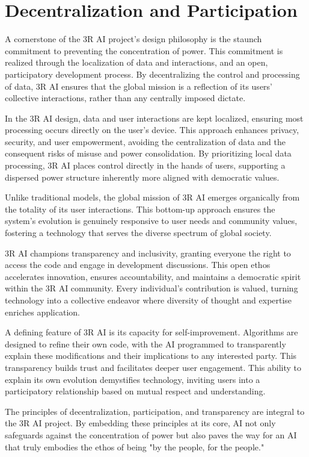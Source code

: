\documentclass[12pt]{article}
\begin{document}
\section*{Decentralization and Participation}

A cornerstone of the 3R AI project's design philosophy is the staunch commitment to preventing the concentration of power. This commitment is realized through the localization of data and interactions, and an open, participatory development process. By decentralizing the control and processing of data, 3R AI ensures that the global mission is a reflection of its users' collective interactions, rather than any centrally imposed dictate.

In the 3R AI design, data and user interactions are kept localized, ensuring most processing occurs directly on the user's device. This approach enhances privacy, security, and user empowerment, avoiding the centralization of data and the consequent risks of misuse and power consolidation. By prioritizing local data processing, 3R AI places control directly in the hands of users, supporting a dispersed power structure inherently more aligned with democratic values.

Unlike traditional models, the global mission of 3R AI emerges organically from the totality of its user interactions. This bottom-up approach ensures the system's evolution is genuinely responsive to user needs and community values, fostering a technology that serves the diverse spectrum of global society.

3R AI champions transparency and inclusivity, granting everyone the right to access the code and engage in development discussions. This open ethos accelerates innovation, ensures accountability, and maintains a democratic spirit within the 3R AI community. Every individual's contribution is valued, turning technology into a collective endeavor where diversity of thought and expertise enriches application.

A defining feature of 3R AI is its capacity for self-improvement. Algorithms are designed to refine their own code, with the AI programmed to transparently explain these modifications and their implications to any interested party. This transparency builds trust and facilitates deeper user engagement. This ability to explain its own evolution demystifies technology, inviting users into a participatory relationship based on mutual respect and understanding.

The principles of decentralization, participation, and transparency are integral to the 3R AI project. By embedding these principles at its core, AI not only safeguards against the concentration of power but also paves the way for an AI that truly embodies the ethos of being "by the people, for the people."
\end{document}
